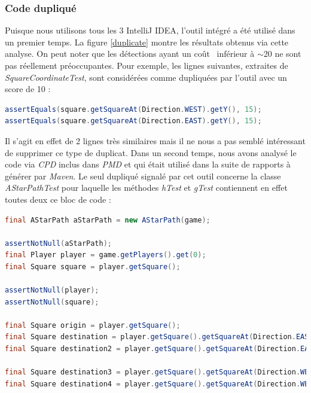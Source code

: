 \documentclass[12pt, openany]{report}
\begin{document}
\subsubsection{Code dupliqué}
Puisque nous utilisons tous les 3 IntelliJ IDEA, l'outil intégré a été utilisé dans un premier temps. La figure \ref{duplicate} montre les résultats obtenus via cette analyse.
On peut noter que les détections ayant un \og coût \fg \, inférieur à $\sim$20 ne sont pas réellement préoccupantes. Pour exemple, les lignes suivantes, extraites de \textit{SquareCoordinateTest}, sont considérées comme dupliquées par l'outil avec un score de 10 :
\begin{lstlisting}[language=java]
assertEquals(square.getSquareAt(Direction.WEST).getY(), 15);
assertEquals(square.getSquareAt(Direction.EAST).getY(), 15);
\end{lstlisting}
Il s'agit en effet de 2 lignes très similaires mais il ne nous a pas semblé intéressant de supprimer ce type de duplicat. 
Dans un second temps, nous avons analysé le code via \textit{CPD} inclus dans \textit{PMD} et qui était utilisé dans la suite de rapports à générer par \textit{Maven}. Le seul dupliqué signalé par cet outil concerne la classe \textit{AStarPathTest} pour laquelle les méthodes \textit{hTest} et \textit{gTest} contiennent en effet toutes deux ce bloc de code :
\begin{lstlisting}[language=java]
final AStarPath aStarPath = new AStarPath(game);

assertNotNull(aStarPath);
final Player player = game.getPlayers().get(0);
final Square square = player.getSquare();

assertNotNull(player);
assertNotNull(square);

final Square origin = player.getSquare();
final Square destination = player.getSquare().getSquareAt(Direction.EAST);
final Square destination2 = player.getSquare().getSquareAt(Direction.EAST).getSquareAt(Direction.EAST);

final Square destination3 = player.getSquare().getSquareAt(Direction.WEST);
final Square destination4 = player.getSquare().getSquareAt(Direction.WEST).getSquareAt(Direction.WEST);
\end{lstlisting}
\end{document}
